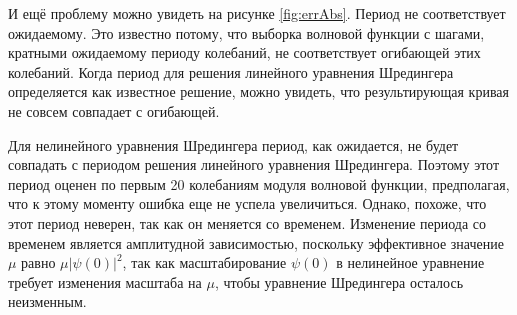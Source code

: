 \documentclass[A4,12pt,oneside]{article}
\renewcommand{\(}{\left(}
\renewcommand{\)}{\right)}
\begin{document}
И ещё проблему можно увидеть на рисунке \ref{fig:errAbs}. Период не соответствует ожидаемому. Это известно потому, что выборка волновой функции с шагами, кратными ожидаемому периоду колебаний, не соответствует огибающей этих колебаний. Когда период для решения линейного уравнения Шредингера определяется как известное решение, можно увидеть, что результирующая кривая не совсем совпадает с огибающей.

Для нелинейного уравнения Шредингера период, как ожидается, не будет совпадать с периодом решения линейного уравнения Шредингера. Поэтому этот период оценен по первым 20 колебаниям модуля волновой функции, предполагая, что к этому моменту ошибка еще не успела увеличиться. Однако, похоже, что этот период неверен, так как он меняется со временем. Изменение периода со временем является амплитудной зависимостью, поскольку эффективное значение $\mu$ равно $\mu\left|\psi\left(0\right)\right|^2$, так как масштабирование $\psi\left(0\right)$ в нелинейное уравнение требует изменения масштаба на $\mu$, чтобы уравнение Шредингера осталось неизменным.
\end{document}
